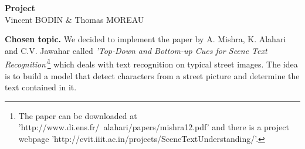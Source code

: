 \documentclass[10pt]{article}
\begin{document}
\begin{center}
\huge\textbf{Project }\normalsize \\
\vspace{0.5cm}
Vincent BODIN \& Thomas MOREAU
\end{center}

\hrulefill
\vspace{1cm}

\textbf{Chosen topic. }We decided to implement the paper by A. Mishra, K. Alahari and C.V. Jawahar called \emph{'Top-Down and Bottom-up Cues for Scene Text Recognition'}\footnote{The paper can be downloaded at 'http://www.di.ens.fr/~alahari/papers/mishra12.pdf' and there is a project webpage 'http://cvit.iiit.ac.in/projects/SceneTextUnderstanding/'.} which deals with text recognition on typical street images. The idea is to build a model that  detect characters from a street picture and determine the text contained in it. \\
\end{document}
